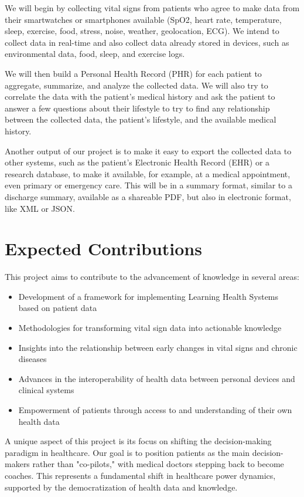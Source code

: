 We will begin by collecting vital signs from patients who agree to make data from their smartwatches or smartphones available (SpO2, heart rate, temperature, sleep, exercise, food, stress, noise, weather, geolocation, ECG). We intend to collect data in real-time and also collect data already stored in devices, such as environmental data, food, sleep, and exercise logs.

We will then build a Personal Health Record (PHR) for each patient to aggregate, summarize, and analyze the collected data. We will also try to correlate the data with the patient's medical history and ask the patient to answer a few questions about their lifestyle to try to find any relationship between the collected data, the patient's lifestyle, and the available medical history.

Another output of our project is to make it easy to export the collected data to other systems, such as the patient's Electronic Health Record (EHR) or a research database, to make it available, for example, at a medical appointment, even primary or emergency care. This will be in a summary format, similar to a discharge summary, available as a shareable PDF, but also in electronic format, like XML or JSON.

\section{Expected Contributions} \label{sec:contributions}

This project aims to contribute to the advancement of knowledge in several areas:

\begin{itemize}
\item Development of a framework for implementing Learning Health Systems based on patient data
\item Methodologies for transforming vital sign data into actionable knowledge
\item Insights into the relationship between early changes in vital signs and chronic diseases
\item Advances in the interoperability of health data between personal devices and clinical systems
\item Empowerment of patients through access to and understanding of their own health data
\end{itemize}

A unique aspect of this project is its focus on shifting the decision-making paradigm in healthcare. Our goal is to position patients as the main decision-makers rather than "co-pilots," with medical doctors stepping back to become coaches. This represents a fundamental shift in healthcare power dynamics, supported by the democratization of health data and knowledge.

